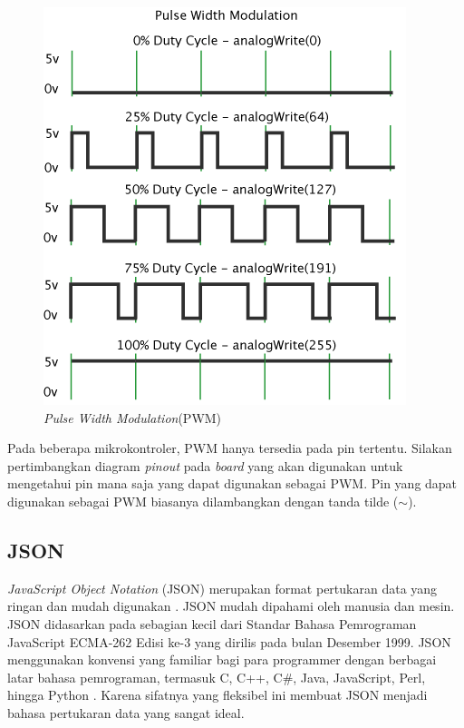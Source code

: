 \begin{figure} [ht] \centering
    \includegraphics[scale=0.8]{gambar/pwm.png}
    \caption{\emph{Pulse Width Modulation}(PWM)}
    \label{fig:PulseWidthModulation}
\end{figure}

\newpage

Pada beberapa mikrokontroler, PWM hanya tersedia pada pin tertentu. Silakan pertimbangkan diagram \emph{pinout} pada \emph{board} yang akan digunakan untuk mengetahui pin mana saja yang dapat digunakan sebagai PWM. Pin yang dapat digunakan sebagai PWM biasanya dilambangkan dengan tanda tilde (\(\sim \)).

\subsection{JSON}

\emph{JavaScript Object Notation} (JSON) merupakan format pertukaran data yang ringan dan mudah digunakan \parencite{Data}. JSON mudah dipahami oleh manusia dan mesin. JSON didasarkan pada sebagian kecil dari Standar Bahasa Pemrograman JavaScript ECMA-262 Edisi ke-3 yang dirilis pada bulan Desember 1999. JSON menggunakan konvensi yang familiar bagi para programmer dengan berbagai latar bahasa pemrograman, termasuk C, C++, C\#, Java, JavaScript, Perl, hingga Python \parencite{Org_2017}. Karena sifatnya yang fleksibel ini membuat JSON menjadi bahasa pertukaran data yang sangat ideal.

